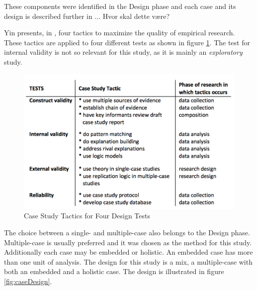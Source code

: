 These components were identified in the Design phase and each case and its design is described further in ... Hvor skal dette være?

Yin presents, in \cite{CaseStudyResearch}, four tactics to maximize the quality of empirical research. These tactics are applied to four different tests as shown in figure \ref{fig:caseTactics}. The test for internal validity is not so relevant for this study, as it is mainly an \textit{exploratory} study.

\begin{figure}[ht]
\begin{center}
\includegraphics[scale=0.82]{caseTactics.png}
\caption[Case Study Tactics for Four Design Tests]{Case Study Tactics for Four Design Tests \cite{CaseStudyResearch}}
\label{fig:caseTactics}
\end{center}
\end{figure}

The choice between a single- and multiple-case also belongs to the Design phase. Multiple-case is usually preferred \cite{CaseStudyResearch} and it was chosen as the method for this study. Additionally each case may be embedded or holistic. An embedded case has more than one unit of analysis. The design for this study is a mix, a multiple-case with both an embedded and a holistic case. %
The design is illustrated in figure \ref{fig:caseDesign}.

